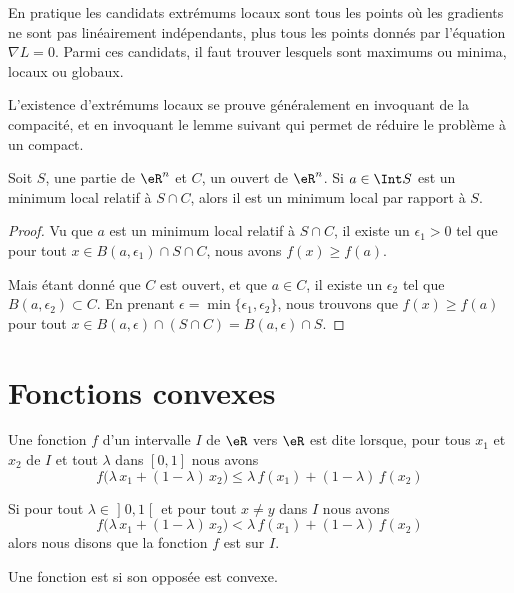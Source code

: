 En pratique les candidats extrémums locaux sont tous les points où les gradients ne sont pas linéairement indépendants, plus tous les points donnés par l'équation \( \nabla L=0\). Parmi ces candidats, il faut trouver lesquels sont maximums ou minima, locaux ou globaux.

L'existence d'extrémums locaux se prouve généralement en invoquant de la compacité, et en invoquant le lemme suivant qui permet de réduire le problème à un compact.

\begin{lemma}       \label{LemmeMinSCimpliqueS}
	Soit \( S\), une partie de \( \eR^n\) et \( C\), un ouvert de \( \eR^n\). Si \( a\in\Int S\) est un minimum local relatif à \( S\cap C\), alors il est un minimum local par rapport à \( S\).
\end{lemma}

\begin{proof}
	Vu que \( a\) est un minimum local relatif à \( S\cap C\), il existe un \( \epsilon_1> 0\) tel que pour tout \( x\in B(a,\epsilon_1)\cap S\cap C\), nous avons \( f(x)\geq f(a)\).

	Mais étant donné que \( C\) est ouvert, et que \( a\in C\), il existe un \( \epsilon_2\) tel que \( B(a,\epsilon_2)\subset C\). En prenant \( \epsilon=\min\{ \epsilon_1,\epsilon_2 \}\), nous trouvons que \( f(x)\geq f(a)\) pour tout \( x\in B(a,\epsilon)\cap(S\cap C)=B(a,\epsilon)\cap S\).
\end{proof}

\section{Fonctions convexes}
\label{SECooVZWWooUjxXYi}

\begin{definition}  \label{DefVQXRJQz}
	Une fonction \( f\) d’un intervalle \( I\) de \( \eR\) vers \( \eR\) est dite  lorsque, pour tous \( x_1\) et \( x_2\) de \( I\) et tout \( \lambda\) dans \( [0, 1]\) nous avons
	\begin{equation}        \label{EQooYNAPooFePQZy}
		f\big(\lambda\, x_1+(1-\lambda)\, x_2\big) \leq \lambda\, f(x_1)+(1-\lambda)\, f(x_2)
	\end{equation}

	Si pour tout \( \lambda\in \mathopen] 0 , 1 \mathclose[\) et pour tout \( x\neq y\) dans \( I\) nous avons
	\begin{equation}		\label{EQooEGBSooCevoPB}
		f\big(\lambda\, x_1+(1-\lambda)\, x_2\big) < \lambda\, f(x_1)+(1-\lambda)\, f(x_2)
	\end{equation}
	alors nous disons que la fonction \( f\) est  sur \( I\).

	Une fonction est  si son opposée est convexe.
\end{definition}

